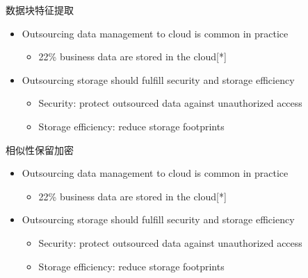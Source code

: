\documentclass{beamer}
\begin{document}
\begin{frame}{数据块特征提取}
    \begin{itemize}
        \item Outsourcing data management to cloud is common in practice
              \begin{itemize}
                  \item 22\% business data are stored in the cloud[*]
              \end{itemize}
        \item  Outsourcing storage should fulfill security and storage efficiency
              \begin{itemize}
                  \item  Security: protect outsourced data against unauthorized access
                  \item  Storage efficiency: reduce storage footprints
              \end{itemize}
    \end{itemize}
\end{frame}

\begin{frame}{相似性保留加密}
    \begin{itemize}
        \item Outsourcing data management to cloud is common in practice
              \begin{itemize}
                  \item 22\% business data are stored in the cloud[*]
              \end{itemize}
        \item  Outsourcing storage should fulfill security and storage efficiency
              \begin{itemize}
                  \item  Security: protect outsourced data against unauthorized access
                  \item  Storage efficiency: reduce storage footprints
              \end{itemize}
    \end{itemize}
\end{frame}

\end{document}
